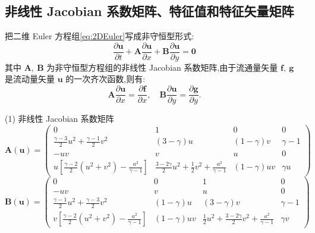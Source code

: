 \documentclass[12pt]{article}
\begin{document}
\subsection{非线性 Jacobian 系数矩阵、特征值和特征矢量矩阵}

把二维 Euler 方程组\cref{eq:2DEuler}写成非守恒型形式:\cite[P289]{cfd}
\begin{equation}
	\frac{\partial \bm{u}}{\partial t}+\bm{A} \frac{\partial \bm{u}}{\partial x}+\bm{B} \frac{\partial \bm{u}}{\partial y}=\mathbf{0}
\end{equation}
其中 $\bm{A},\ \bm{B}$ 为非守恒型方程组的非线性 Jacobian 系数矩阵,由于流通量矢量 $\bm{f},\  \bm{g}$ 是流动量矢量 $\bm{u}$ 的一次齐次函数,则有:
\begin{equation}
	\bm{A} \frac{\partial \bm{u}}{\partial x}=\frac{\partial \bm{f}}{\partial x}, \quad \bm{B} \frac{\partial \bm{u}}{\partial y}=\frac{\partial \bm{g}}{\partial y}.
\end{equation}

(1) 非线性 Jacobian 系数矩阵
\begin{equation}
	\bm{A}(\bm{u})=\left(\begin{array}{cccc}
			0                                                                               & 1                                                                   & 0              & 0        \\
			\frac{\gamma-3}{2} u^{2}+\frac{\gamma-1}{2} v^{2}                               & (3-\gamma) u                                                        & (1-\gamma) v   & \gamma-1 \\
			-u v                                                                            & v                                                                   & u              & 0        \\
			u\left[\frac{\gamma-2}{2}\left(u^{2}+v^{2}\right)-\frac{a^{2}}{\gamma-1}\right] & \frac{3-2 \gamma}{2} u^{2}+\frac{1}{2} v^{2}+\frac{a^{2}}{\gamma-1} & (1-\gamma) u v & \gamma u
		\end{array}\right)
\end{equation}
\begin{equation}
	\bm{B}(\bm{u})=\left(\begin{array}{cccc}
			0                                                                                 & 0              & 1                                                                   & 0        \\
			-u v                                                                              & v              & u                                                                   & 0        \\
			\frac{\gamma-1}{2} u^{2}+\frac{\gamma-3}{2} v^{2}                                 & (1-\gamma) u   & (3-\gamma) v                                                        & \gamma-1 \\
			v{\left[\frac{\gamma-2}{2}\left(u^{2}+v^{2}\right)-\frac{a^{2}}{\gamma-1}\right]} & (1-\gamma) u v & \frac{1}{2} u^{2}+\frac{3-2 \gamma}{2} v^{2}+\frac{a^{2}}{\gamma-1} & \gamma v
		\end{array}\right)
\end{equation}
\end{document}
